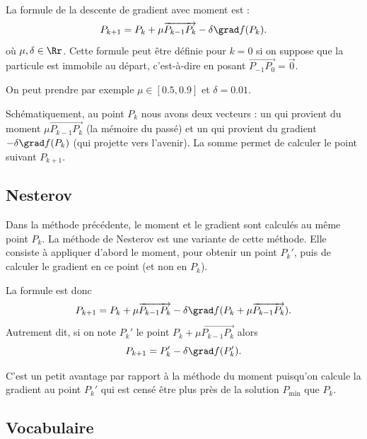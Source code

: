 \documentclass[11pt,class=report,crop=false]{standalone}
\begin{document}
La formule de la descente de gradient avec moment est :
$$P_{k+1} = P_k + \mu\overrightarrow{P_{k-1}P_k}  - \delta \grad f(P_k).$$
où $\mu,\delta \in \Rr$. Cette formule peut être définie pour $k=0$ si on suppose que la particule est immobile au départ, c'est-à-dire en posant $\overrightarrow{P_{-1}P_0} = \vec 0$.

On peut prendre par exemple $\mu \in [0.5,0.9]$ et $\delta = 0.01$.


Schématiquement, au point $P_k$ nous avons deux vecteurs : un qui provient du moment $\mu\overrightarrow{P_{k-1}P_k}$ (la mémoire du passé) et un qui provient du gradient $- \delta \grad f(P_k)$ (qui projette vers l'avenir). La somme permet de calculer le point suivant  $P_{k+1}$.






\subsection{Nesterov}


Dans la méthode précédente, le moment et le gradient sont calculés au même point $P_k$. La méthode de Nesterov est une variante de cette méthode. 
Elle consiste à appliquer d'abord le moment, pour obtenir un point $P_k'$, puis de calculer le gradient en ce point (et non en $P_k$).

La formule est donc 
$$P_{k+1} = P_k + \mu\overrightarrow{P_{k-1}P_k}  - \delta \grad f(P_k+\mu\overrightarrow{P_{k-1}P_k}).$$
Autrement dit, si on note $P_k'$ le point $P_k + \mu\overrightarrow{P_{k-1}P_k}$ alors
$$P_{k+1} = P_k'  - \delta \grad f(P_k').$$



C'est un petit avantage par rapport à la méthode du moment puisqu'on calcule la gradient au point $P_k'$ qui est censé être plus près de la solution $P_{\min}$ que $P_k$.


\subsection{Vocabulaire}
\end{document}
